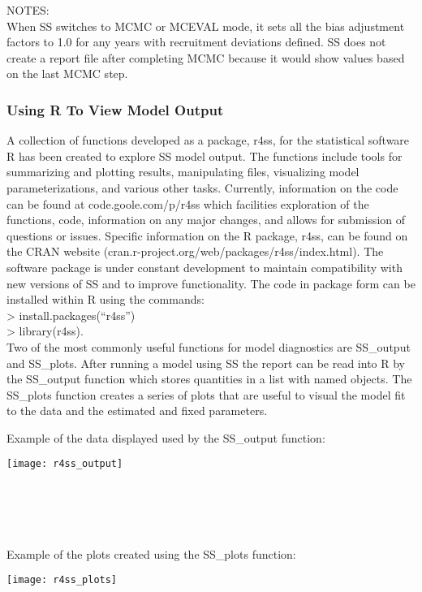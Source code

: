 \noindent NOTES:\\
When SS switches to MCMC or MCEVAL mode, it sets all the bias adjustment factors to 1.0 for any years with recruitment deviations defined.  SS does not create a report file after completing MCMC because it would show values based on the last MCMC step.

\subsubsection{Using R To View Model Output}
A collection of functions developed as a package, r4ss, for the statistical software R has been created to explore SS model output.  The functions include tools for summarizing and plotting results, manipulating files, visualizing model parameterizations, and various other tasks.  Currently, information on the code can be found at code.goole.com/p/r4ss which facilities exploration of the functions, code, information on any major changes, and allows for submission of questions or issues.  Specific information on the R package, r4ss, can be found on the CRAN website (cran.r-project.org/web/packages/r4ss/index.html).  The software package is under constant development to maintain compatibility with new versions of SS and to improve functionality.  The code in package form can be installed within R using the commands: \\
> install.packages(“r4ss”) \\
> library(r4ss).  \\

Two of the most commonly useful functions for model diagnostics are SS\_output and SS\_plots.  After running a model using SS the report can be read into R by the SS\_output function which stores quantities in a list with named objects.  The SS\_plots function creates a series of plots that are useful to visual the model fit to the data and the estimated and fixed parameters.

Example of the data displayed used by the SS\_output function:
\begin{center}
	\texttt{[image: r4ss\_output]}
\end{center}
\hfil\\
\hfil\\
\hfil\\
\hfil\\
Example of the plots created using the SS\_plots function:
\begin{center}
	\texttt{[image: r4ss\_plots]}
\end{center}

